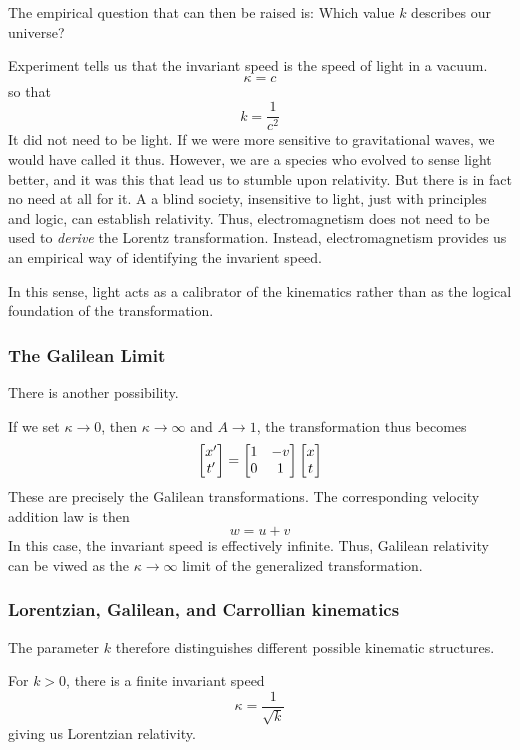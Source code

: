 		The empirical question that can then be raised is: Which value $k$ describes our universe?

		Experiment tells us that the invariant speed is the speed of light in a vacuum.
		\begin{equation}
		    \kappa = c
		\end{equation}
		so that
		\begin{equation}
		    k = \frac{1}{c^2} 
		\end{equation}
		It did not need to be light. If we were more sensitive to gravitational waves,
		we would have called it thus. However, we are a species who evolved to sense light
		better, and it was this that lead us to stumble upon relativity. But there is in 
		fact no need at all for it. A a blind society, insensitive to light, just with principles and logic, can
		establish relativity. Thus, electromagnetism does not need to be used to \textit{derive} the Lorentz
		transformation. Instead, electromagnetism provides us an empirical way of identifying
		the invarient speed. 
		
		In this sense, light acts as a calibrator of the kinematics rather than as the logical 
		foundation of the transformation.
		
	\subsubsection{The Galilean Limit}
		There is another possibility.

		If we set $\kappa\to 0$, then $\kappa\to\infty$ and $A\to1$,
		the transformation thus becomes
		\[
		    \bmqty{
		    	x'\\t'
		    } =
			\bmqty{
				1 & -v \\
				0 & 1
			} \bmqty{
				x\\t	
			} 
		\]
		These are precisely the Galilean transformations. The corresponding 
		velocity addition law is then
		\[
			w = u + v
		\]
		In this case, the invariant speed is effectively infinite. Thus, Galilean relativity can 
		be viwed as the $\kappa \to \infty$ limit of the generalized transformation.
	\subsubsection{Lorentzian, Galilean, and Carrollian kinematics}
		The parameter $k$ therefore distinguishes different possible kinematic structures.

		For $k>0$, there is a finite invariant speed
		\[
			\kappa = \frac{1}{\sqrt{k}} 
		\]
		giving us Lorentzian relativity.

